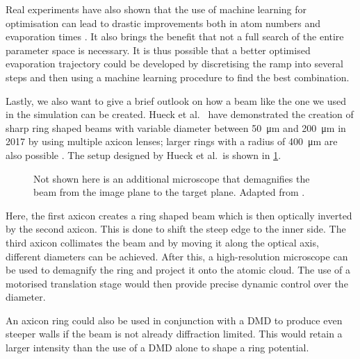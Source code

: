 Real experiments have also shown that the use of machine learning for optimisation can lead to drastic improvements both in atom numbers and evaporation times \cite{machinelearning1,machinelearning2}. It also brings the benefit that not a full search of the entire parameter space is necessary. It is thus possible that a better optimised evaporation trajectory could be developed by discretising the ramp into several steps and then using a machine learning procedure to find the best combination.

Lastly, we also want to give a brief outlook on how a beam like the one we used in the simulation can be created. Hueck et al.\ \cite{axiconSM} have demonstrated the creation of sharp ring shaped beams with variable diameter between \SI{50}{\micro\meter} and \SI{200}{\micro\meter} in 2017 by using multiple axicon \cite{McLeod} lenses; larger rings with a radius of \SI{400}{\micro\meter} are also possible \cite{MANEK199867}.
The setup designed by Hueck et al.\ is shown in \cref{fig:proposed_beam}.
\begin{figure}[bp]
    \centering
    
    \caption[Optical setup to create a ring beam with dynamically adjustable radius]{Not shown here is an additional microscope that demagnifies the beam from the image plane to the target plane. Adapted from \cite{axiconSM}.}
    \label{fig:proposed_beam}
\end{figure}
Here, the first axicon creates a ring shaped beam which is then optically inverted by the second axicon. This is done to shift the steep edge to the inner side. The third axicon collimates the beam and by moving it along the optical axis, different diameters can be achieved. After this, a high-resolution microscope can be used to demagnify the ring and project it onto the atomic cloud.
The use of a motorised translation stage would then provide precise dynamic control over the diameter.

An axicon ring could also be used in conjunction with a DMD to produce even steeper walls if the beam is not already diffraction limited. This would retain a larger intensity than the use of a DMD alone to shape a ring potential.


